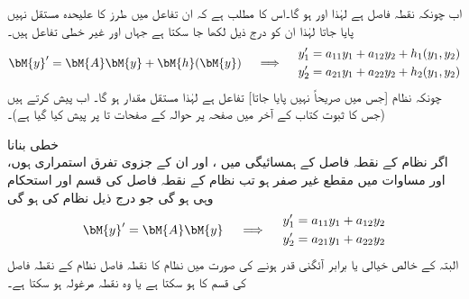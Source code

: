 اب چونکہ  نقطہ فاصل ہے لہٰذا اور    ہو گا۔اس کا مطلب ہے کہ ان تفاعل میں  طرز کا علیحدہ مستقل نہیں پایا جاتا لہٰذا ان کو درج ذیل لکھا جا سکتا ہے جہاں  اور  غیر خطی تفاعل ہیں۔
\begin{gather}\label{مساوات_نظام_غیر_خطی_ترکیب_مرحلہ_ب}
\begin{aligned}
\bM{y}'=\bM{A}\bM{y}+\bM{h}(\bM{y})
\end{aligned} \quad \implies \quad 
\begin{aligned}
y_1'&=a_{11}y_1+a_{12}y_2+h_1(y_1,y_2)\\
y_2'&=a_{21}y_1+a_{22}y_2+h_2(y_1,y_2)
\end{aligned}
\end{gather}
چونکہ نظام   [جس میں  صریحاً نہیں پایا جاتا] تفاعل ہے لہٰذا  مستقل مقدار ہو گا۔ اب  پیش کرتے ہیں (جس کا ثبوت کتاب کے آخر میں صفحہ  پر حوالہ \cite{حوالہ_کریزگ_الف_سات} کے صفحات  تا  پر پیش کیا گیا ہے)۔

\quad خطی بنانا\\
اگر نظام  کے نقطہ فاصل  کے ہمسائیگی میں  ،  اور ان کے جزوی تفرق استمراری ہوں، اور  مساوات  میں مقطع  غیر صفر  ہو تب نظام  کے نقطہ فاصل کی قسم اور استحکام وہی ہو گی جو درج ذیل  نظام کی ہو گی
\begin{gather}\label{مساوات_نظام_غیر_خطی_ترکیب_مرحلہ_پ}
\begin{aligned}
\bM{y}'=\bM{A}\bM{y}
\end{aligned} \quad \implies \quad 
\begin{aligned}
y_1'&=a_{11}y_1+a_{12}y_2\\
y_2'&=a_{21}y_1+a_{22}y_2
\end{aligned}
\end{gather}
البتہ  کے خالص خیالی یا برابر آئگنی قدر ہونے کی صورت میں نظام  کا نقطہ فاصل نظام  کے نقطہ فاصل کی قسم کا ہو سکتا ہے یا وہ نقطہ مرغولہ ہو سکتا ہے۔ 

